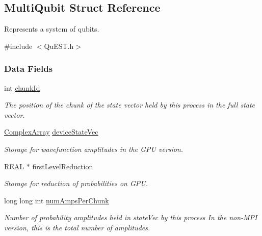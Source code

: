 \hypertarget{structMultiQubit}{}\subsection{Multi\+Qubit Struct Reference}
\label{structMultiQubit}


Represents a system of qubits.  




{\ttfamily \#include $<$Qu\+E\+S\+T.\+h$>$}

\subsubsection*{Data Fields}
\begin{DoxyCompactItemize}
\item 
int \mbox{\hyperlink{structMultiQubit_ab10c88249fa3825d6227ceec01d37e37}{chunk\+Id}}
\begin{DoxyCompactList}\small\item\em The position of the chunk of the state vector held by this process in the full state vector. \end{DoxyCompactList}\item 
\mbox{\hyperlink{structComplexArray}{Complex\+Array}} \mbox{\hyperlink{structMultiQubit_a59ac613486a41b8c9a4b6e79cc8d2cc3}{device\+State\+Vec}}
\begin{DoxyCompactList}\small\item\em Storage for wavefunction amplitudes in the G\+PU version. \end{DoxyCompactList}\item 
\mbox{\hyperlink{QuEST__precision_8h_a4b654506f18b8bfd61ad2a29a7e38c25}{R\+E\+AL}} $\ast$ \mbox{\hyperlink{structMultiQubit_a4e0088b41adab0a40b7a31e528ed42b5}{first\+Level\+Reduction}}
\begin{DoxyCompactList}\small\item\em Storage for reduction of probabilities on G\+PU. \end{DoxyCompactList}\item 
long long int \mbox{\hyperlink{structMultiQubit_a1cad83601a78635dd278259c7ed54f18}{num\+Amps\+Per\+Chunk}}
\begin{DoxyCompactList}\small\item\em Number of probability amplitudes held in state\+Vec by this process In the non-\/\+M\+PI version, this is the total number of amplitudes. \end{DoxyCompactList}\item 

\end{DoxyCompactItemize}
